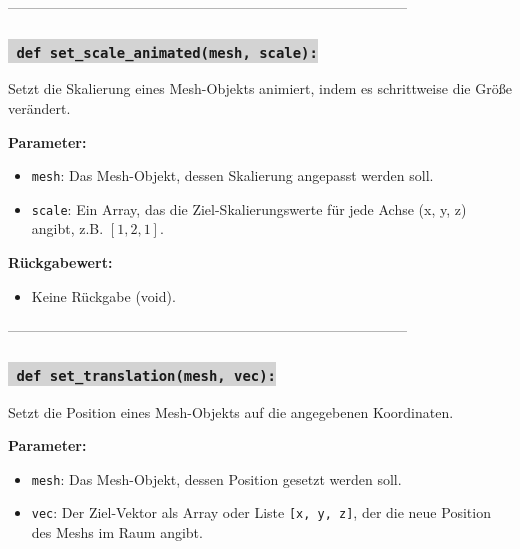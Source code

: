 --------------------------------------------------------------------------------------

\subsubsection*{\colorbox{lightgray}{\texttt{\textbf{\color{green} def} \color{blue} set\_scale\_animated}\textbf{\texttt{(mesh, scale):}}}}
Setzt die Skalierung eines Mesh-Objekts animiert, indem es schrittweise die Größe verändert.

\noindent \textbf{Parameter:} \vspace{-6ex} \\
\begin{itemize}
    \setlength{\itemindent}{1em}
    \item \texttt{mesh}: Das Mesh-Objekt, dessen Skalierung angepasst werden soll.
    \item \texttt{scale}: Ein Array, das die Ziel-Skalierungswerte für jede Achse (x, y, z) angibt, z.B. \([1, 2, 1]\).
\end{itemize}

\noindent \textbf{Rückgabewert:} \vspace{-6ex} \\
\begin{itemize}
    \setlength{\itemindent}{1em}
    \item Keine Rückgabe (void).
\end{itemize}

--------------------------------------------------------------------------------------



\subsubsection*{\colorbox{lightgray}{\texttt{\textbf{\color{green} def} \color{blue} set\_translation}\textbf{\texttt{(mesh, vec):}}}}
Setzt die Position eines Mesh-Objekts auf die angegebenen Koordinaten.

\noindent \textbf{Parameter:} \vspace{-6ex} \\
\begin{itemize}
    \setlength{\itemindent}{1em}
    \item \texttt{mesh}: Das Mesh-Objekt, dessen Position gesetzt werden soll.
    \item \texttt{vec}: Der Ziel-Vektor als Array oder Liste \texttt{[x, y, z]}, der die neue Position des Meshs im Raum angibt.
\end{itemize}

